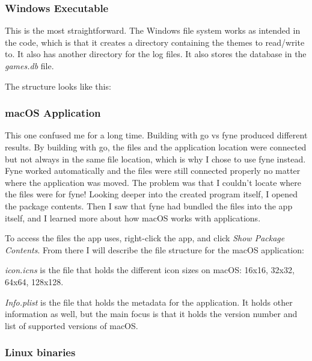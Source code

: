 \subsubsection{Windows Executable}

This is the most straightforward. The Windows file system works as
intended in the code, which is that it creates a directory containing
the themes to read/write to. It also has another directory for the
log files. It also stores the database in the \textit{games.db} file.

The structure looks like this:


\subsubsection{macOS Application}

This one confused me for a long time.
Building with go vs fyne produced different results.
By building with go, the files and the application location were
connected but not always in the same file location, which is why I
chose to use fyne instead.
Fyne worked automatically and the files were still connected properly
no matter where the application was moved.
The problem was that I couldn't locate where the files were for fyne!
Looking deeper into the created program itself, I opened the package contents.
Then I saw that fyne had bundled the files into the app itself, and I
learned more about how macOS works with applications.

To access the files the app uses, right-click the app, and click
\textit{Show Package Contents}.
From there I will describe the file structure for the macOS application:


\textit{icon.icns} is the file that holds the different icon sizes on
macOS: 16x16, 32x32, 64x64, 128x128.

\textit{Info.plist} is the file that holds the metadata for the
application. It holds other information as well, but the main focus
is that it holds the version number and list of supported versions of macOS.

\subsubsection{Linux binaries}


